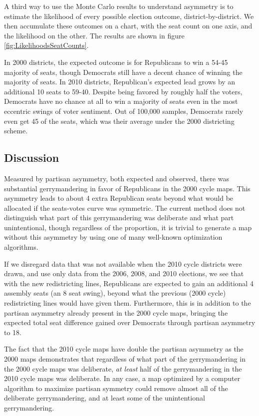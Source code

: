 \documentclass[preprint,12pt]{article}
\begin{document}
A third way to use the Monte Carlo results to understand asymmetry is to estimate the likelihood of every possible election outcome, district-by-district.
We then accumulate these outcomes on a chart, with the seat count on one axis, and the likelihood on the other.  The results are shown in figure \ref{fig:LikelihoodsSeatCounts}.

In 2000 districts, the expected outcome is for Republicans to win a 54-45 majority of seats, though Democrats still have a decent chance of winning the majority of seats. 
In 2010 districts, Republican's expected lead grows by an additional 10 seats to 59-40. 
Despite being favored by roughly half the voters, Democrats have no chance at all to win a majority of seats even in the most eccentric swings of voter sentiment.
Out of 100,000 samples, Democrats rarely even get 45 of the seats, which was their average under the 2000 districting scheme.

\subsection{Discussion}

Measured by partisan asymmetry, both expected and observed, there was substantial gerrymandering in favor of Republicans in the 2000 cycle maps.
This asymmetry leads to about 4 extra Republican seats beyond what would be allocated if the seats-votes curve was symmetric.
The current method does not distinguish what part of this gerrymandering was deliberate and what part unintentional, though regardless of the proportion, it is trivial to generate a map without this asymmetry by using one of many well-known optimization algorithms.

If we disregard data that was not available when the 2010 cycle districts were drawn, and use only data from the 2006, 2008, and 2010 elections, we see that with the new redistricting lines, Republicans are expected to gain an additional 4 assembly seats (an 8 seat swing), beyond what the previous (2000 cycle) redistricting lines would have given them.
Furthermore, this is in addition to the partisan asymmetry already present in the 2000 cycle maps, bringing the expected total seat difference gained over Democrats through partisan asymmetry to 18.

The fact that the 2010 cycle maps have double the partisan asymmetry as the 2000 maps demonstrates that regardless of what part of the gerrymandering in the 2000 cycle maps was deliberate, \emph{at least} half of the gerrymandering in the 2010 cycle maps was deliberate.
In any case, a map optimized by a computer algorithm to maximize partisan symmetry could remove almost all of the deliberate gerrymandering, and at least some of the unintentional gerrymandering.
\end{document}
